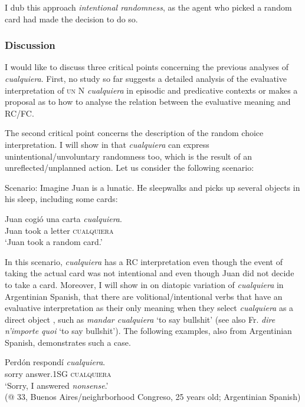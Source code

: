 I dub this approach \textit{intentional randomness}, as the agent who picked a random card had made the decision to do so.

\subsubsection{Discussion} \label{sec:2.2.3.3}

I would like to discuss three critical points concerning the previous analyses of \textit{cualquiera}. First, no study so far suggests a detailed analysis of the evaluative interpretation of \textsc{un} N \textit{cualquiera} in episodic and predicative contexts or makes a proposal as to how to analyse the relation between the evaluative meaning and RC/FC.

The second critical point concerns the description of the random choice interpretation. I will show in  that \textit{cualquiera} can express unintentional/unvoluntary randomness too, which is the result of an unreflected/unplanned action. Let us consider the following scenario:

\ea \label{ex:key:104} %
  Scenario: Imagine Juan is a lunatic. He sleepwalks and picks up several objects in his sleep, including some cards:

  \gll Juan cogió una carta \textit{cualquiera}.\\
  Juan took a letter \textsc{cualquiera}\\
  \glt ‘Juan took a random card.’
\z

In this scenario, \textit{cualquiera} has a RC interpretation even though the event of taking the actual card was not intentional and even though Juan did not decide to take a card. Moreover, I will show in  on diatopic variation of \textit{cualquiera} in Argentinian Spanish, that there are volitional/intentional verbs that have an evaluative interpretation as their only meaning when they select \textit{cualquiera} as a direct object , such as \textit{mandar cualquiera} ‘to say bullshit’ (see also Fr. \textit{dire n’importe quoi} ‘to say bullshit’). The following examples, also from Argentinian Spanish, demonstrates such a case.

\ea \label{ex:key:105} %
  \gll Perdón respondí \textit{cualquiera}.\\
  sorry answer.1SG \textsc{cualquiera}\\
  \glt ‘Sorry, I answered \textit{nonsense}.’\\
  (@ 33, Buenos Aires/neighrborhood Congreso, 25 years old; Argentinian Spanish)
\z

